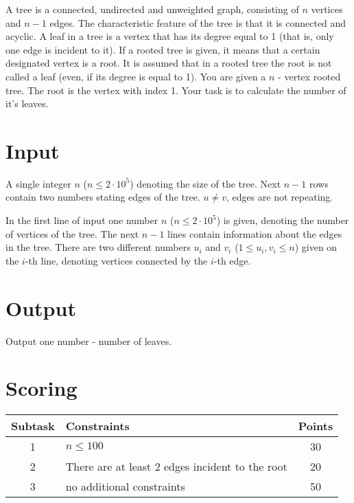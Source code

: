 \documentclass{spiral}
\begin{document}
    \makeheader

    A tree is a connected, undirected and unweighted graph,
    consisting of $n$ vertices and $n-1$ edges.
    The characteristic feature of the tree is that it is connected and acyclic.
    A leaf in a tree is a vertex that has its degree equal to 1
    (that is, only one edge is incident to it).
    If a rooted tree is given, it means that a certain designated vertex is a root.
    It is assumed that in a rooted tree the root is not called a leaf
    (even, if its degree is equal to 1).
    You are given a $n$ - vertex rooted tree.
    The root is the vertex with index 1.
    Your task is to calculate the number of it's leaves.

\section{Input}

    A single integer $n$ ($n \leq 2 \cdot 10^5$) denoting the size of the tree.
    Next $n-1$ rows contain two numbers stating edges of the tree.
    $u \neq v$, edges are not repeating.

    In the first line of input one number $n$ ($n \leq 2 \cdot 10^5$) is given,
    denoting the number of vertices of the tree.
    The next $n-1$ lines contain information about the edges in the tree.
    There are two different numbers $u_i$ and $v_i$ ($1 \leq u_i, v_i \leq n$)
    given on the $i$-th line, denoting vertices connected by the $i$-th edge.

\section{Output}

    Output one number - number of leaves.


\section{Scoring}

    \begin{center}
        \begin{tabular}{|c|p{5cm}|c|}
            \hline
            \textbf{Subtask} & \textbf{Constraints} & \textbf{Points} \\
            \hline
            1 & $n \leq 100$ & 30 \\
            \hline
            2 & There are at least 2 edges incident to the root & 20 \\
            \hline
            3 & no additional constraints & 50 \\
            \hline
        \end{tabular}
    \end{center}
\end{document}
